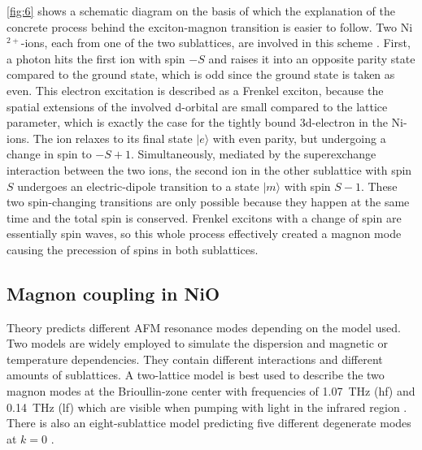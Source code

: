 \autoref{fig:6} shows a schematic diagram on the basis of which the explanation of the concrete process behind the exciton-magnon transition is easier to follow.
Two Ni$^{2+}$-ions, each from one of the two sublattices, are involved in this scheme \cite{bossini_ultrafast_2021}.
First, a photon hits the first ion with spin $-S$ and raises it into an opposite parity state compared to the ground state, which is odd since the ground state is taken as even.
This electron excitation is described as a Frenkel exciton, because the spatial extensions of the involved d-orbital are small compared to the lattice parameter, which is exactly the case for the tightly bound 3d-electron in the Ni-ions.
The ion relaxes to its final state $|e\rangle$ with even parity, but undergoing a change in spin to $-S+1$.
Simultaneously, mediated by the superexchange interaction between the two ions, the second ion in the other sublattice with spin $S$ undergoes an electric-dipole transition to a state $|m\rangle$ with spin $S-1$.
These two spin-changing transitions are only possible because they happen at the same time and the total spin is conserved.
Frenkel excitons with a change of spin are essentially spin waves, so this whole process effectively created a magnon mode causing the precession of spins in both sublattices.

\subsection{Magnon coupling in NiO}
\label{sec:mode_coupling}
Theory predicts different AFM resonance modes depending on the model used.
Two models are widely employed to simulate the dispersion and magnetic or temperature dependencies.
They contain different interactions and different amounts of sublattices.
A two-lattice model is best used to describe the two magnon modes at the Brioullin-zone center with frequencies of \qty{1.07}{THz} (hf) and \qty{0.14}{THz} (lf) \cite{rezende_introduction_2019} which are visible when pumping with light in the infrared region \cite{tzschaschel_ultrafast_2017}.
There is also an eight-sublattice model predicting five different degenerate modes at $k=0$ \cite{milano_magnetic_2010}\cite{milano_effect_2004}.

